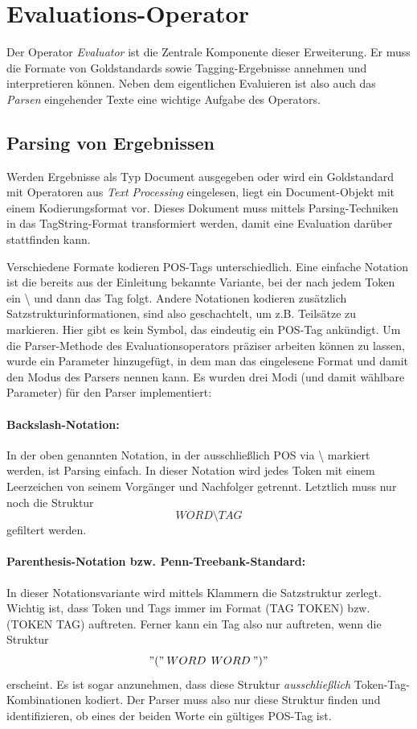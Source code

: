 \section{Evaluations-Operator}
\label{sec:impl:eval}
Der Operator \textit{Evaluator} ist die Zentrale Komponente dieser Erweiterung. Er muss die Formate von Goldstandards sowie Tagging-Ergebnisse annehmen und interpretieren können. Neben dem eigentlichen Evaluieren ist also auch das \textit{Parsen} eingehender Texte eine wichtige Aufgabe des Operators. 

\subsection{Parsing von Ergebnissen}
\label{sec:impl:eval:parsing}
Werden Ergebnisse als Typ Document ausgegeben oder wird ein Goldstandard mit Operatoren aus \textit{Text Processing} eingelesen, liegt ein Document-Objekt mit einem Kodierungsformat vor. Dieses Dokument muss mittels Parsing-Techniken in das TagString-Format transformiert werden, damit eine Evaluation darüber stattfinden kann.

Verschiedene Formate kodieren POS-Tags unterschiedlich. Eine einfache Notation ist die bereits aus der Einleitung bekannte Variante, bei der nach jedem Token ein \glqq \textbackslash \grqq{} und dann das Tag folgt. Andere Notationen kodieren zusätzlich Satzstrukturinformationen, sind also geschachtelt, um z.B. Teilsätze zu markieren. Hier gibt es kein Symbol, das eindeutig ein POS-Tag ankündigt. Um die Parser-Methode des Evaluationsoperators präziser arbeiten können zu lassen, wurde ein Parameter hinzugefügt, in dem man das eingelesene Format und damit den Modus des Parsers nennen kann. Es wurden drei Modi (und damit wählbare Parameter) für den Parser implementiert:

\paragraph{Backslash-Notation:} \cite{Smith} In der oben genannten Notation, in der ausschließlich POS via \glqq \textbackslash \grqq{} markiert werden, ist Parsing einfach. In dieser Notation wird jedes Token mit einem Leerzeichen von seinem Vorgänger und Nachfolger getrennt. Letztlich muss nur noch die Struktur
\[ WORD \mbox{\textbackslash} TAG\]
gefiltert werden.

\paragraph{Parenthesis-Notation bzw. Penn-Treebank-Standard:} \cite{Paper:PennBank} In dieser Notationsvariante wird mittels Klammern die Satzstruktur zerlegt. Wichtig ist, dass Token und Tags immer im Format \textsc{(TAG TOKEN)} bzw. \textsc{(TOKEN TAG)} auftreten. Ferner kann ein Tag also nur auftreten, wenn die Struktur
\[ "(" \: WORD \:\: WORD \: ")" \]
erscheint. Es ist sogar anzunehmen, dass diese Struktur \textit{ausschließlich} Token-Tag-Kombinationen kodiert. Der Parser muss also nur diese Struktur finden und identifizieren, ob eines der beiden Worte ein gültiges POS-Tag ist.

